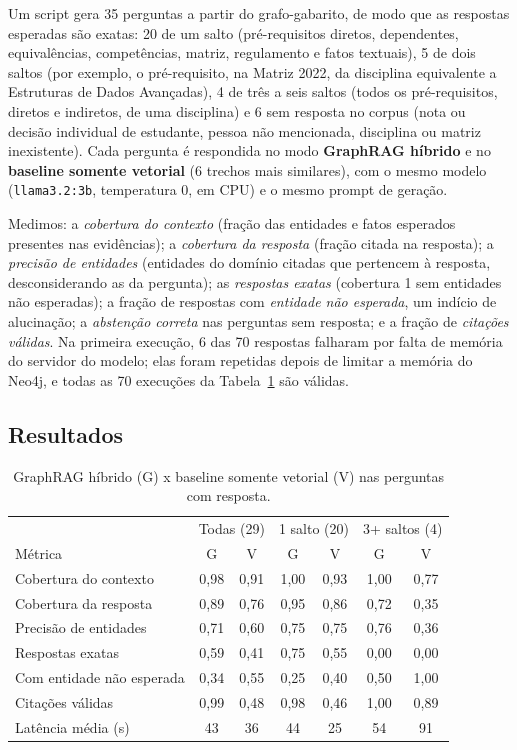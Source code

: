 \documentclass[12pt]{article}
\begin{document}
Um script gera 35 perguntas a partir do grafo-gabarito, de modo que as respostas
esperadas são exatas: 20 de um salto (pré-requisitos diretos, dependentes,
equivalências, competências, matriz, regulamento e fatos textuais), 5 de dois saltos
(por exemplo, o pré-requisito, na Matriz 2022, da disciplina equivalente a Estruturas de
Dados Avançadas), 4 de três a seis saltos (todos os pré-requisitos, diretos e indiretos,
de uma disciplina) e 6 sem resposta no corpus (nota ou decisão individual de estudante,
pessoa não mencionada, disciplina ou matriz inexistente). Cada pergunta é respondida no
modo \textbf{GraphRAG híbrido} e no \textbf{baseline somente vetorial} (6 trechos mais
similares), com o mesmo modelo (\texttt{llama3.2:3b}, temperatura 0, em CPU) e o mesmo
prompt de geração.

Medimos: a \emph{cobertura do contexto} (fração das entidades e fatos esperados presentes
nas evidências); a \emph{cobertura da resposta} (fração citada na resposta); a
\emph{precisão de entidades} (entidades do domínio citadas que pertencem à resposta,
desconsiderando as da pergunta); as \emph{respostas exatas} (cobertura 1 sem entidades
não esperadas); a fração de respostas com \emph{entidade não esperada}, um indício de
alucinação; a \emph{abstenção correta} nas perguntas sem resposta; e a fração de
\emph{citações válidas}. Na primeira execução, 6 das 70 respostas falharam por falta de
memória do servidor do modelo; elas foram repetidas depois de limitar a memória do Neo4j,
e todas as 70 execuções da Tabela~\ref{tab:resultados} são válidas.

\subsection{Resultados}

\begin{table}[ht]
\centering
\caption{GraphRAG híbrido (G) x baseline somente vetorial (V) nas perguntas com resposta.}
\label{tab:resultados}
\small
\begin{tabular}{lcccccc}
\toprule
 & \multicolumn{2}{c}{Todas (29)} & \multicolumn{2}{c}{1 salto (20)} & \multicolumn{2}{c}{3+ saltos (4)} \\
Métrica & G & V & G & V & G & V \\
\midrule
Cobertura do contexto        & 0,98 & 0,91 & 1,00 & 0,93 & 1,00 & 0,77 \\
Cobertura da resposta        & 0,89 & 0,76 & 0,95 & 0,86 & 0,72 & 0,35 \\
Precisão de entidades        & 0,71 & 0,60 & 0,75 & 0,75 & 0,76 & 0,36 \\
Respostas exatas             & 0,59 & 0,41 & 0,75 & 0,55 & 0,00 & 0,00 \\
Com entidade não esperada    & 0,34 & 0,55 & 0,25 & 0,40 & 0,50 & 1,00 \\
Citações válidas             & 0,99 & 0,48 & 0,98 & 0,46 & 1,00 & 0,89 \\
Latência média (s)           & 43   & 36   & 44   & 25   & 54   & 91   \\
\bottomrule
\end{tabular}
\end{table}
\end{document}

